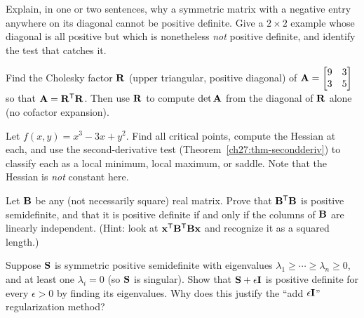 \begin{exercise}
\label{ch27:ex-diag}
Explain, in one or two sentences, why a symmetric matrix with a negative entry anywhere on its
diagonal cannot be positive definite. Give a $2\times2$ example whose diagonal is all positive but
which is nonetheless \emph{not} positive definite, and identify the test that catches it.
\end{exercise}

\begin{exercise}
\label{ch27:ex-chol}
Find the Cholesky factor $\mathbf{R}$ (upper triangular, positive diagonal) of
$\mathbf{A} = \begin{bmatrix} 9 & 3 \\ 3 & 5 \end{bmatrix}$ so that $\mathbf{A}=\mathbf{R}^{\mathsf{T}}\mathbf{R}$. Then use
$\mathbf{R}$ to compute $\det\mathbf{A}$ from the diagonal of $\mathbf{R}$ alone (no cofactor expansion).
\end{exercise}

\begin{exercise}
\label{ch27:ex-classify}
Let $f(x,y) = x^3 - 3x + y^2$. Find all critical points, compute the Hessian at each, and use the
second-derivative test (Theorem~\ref{ch27:thm-secondderiv}) to classify each as a local minimum,
local maximum, or saddle. Note that the Hessian is \emph{not} constant here.
\end{exercise}

\begin{exercise}
\label{ch27:ex-ata}
Let $\mathbf{B}$ be any (not necessarily square) real matrix. Prove that $\mathbf{B}^{\mathsf{T}}\mathbf{B}$ is positive
semidefinite, and that it is positive definite if and only if the columns of $\mathbf{B}$ are linearly
independent. (Hint: look at $\mathbf{x}^{\mathsf{T}}\mathbf{B}^{\mathsf{T}}\mathbf{B}\mathbf{x}$ and recognize it as a squared length.)
\end{exercise}

\begin{exercise}
\label{ch27:ex-reg}
Suppose $\mathbf{S}$ is symmetric positive semidefinite with eigenvalues $\lambda_1\geq\cdots\geq
\lambda_n\geq 0$, and at least one $\lambda_i = 0$ (so $\mathbf{S}$ is singular). Show that
$\mathbf{S}+\epsilon\mathbf{I}$ is positive definite for every $\epsilon>0$ by finding its eigenvalues.
Why does this justify the ``add $\epsilon\mathbf{I}$'' regularization method?
\end{exercise}

